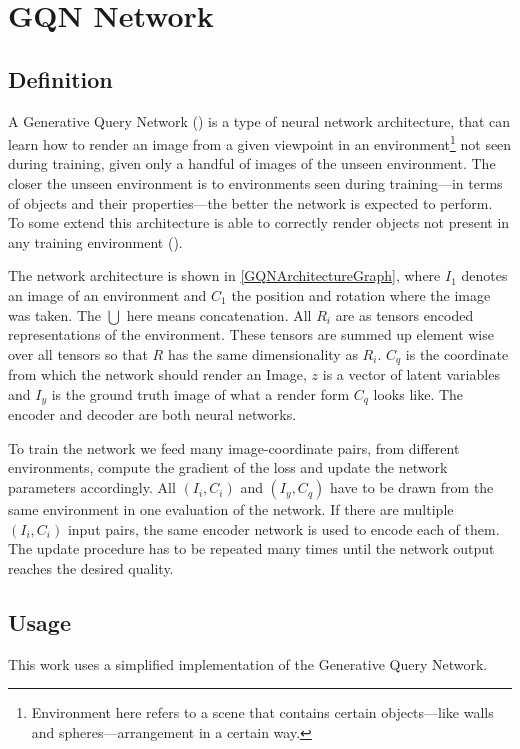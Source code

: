 \section{GQN Network}\label{BackgroundGQN}
\subsection{Definition}
A Generative Query Network (\cite{gqn}) is a type of neural network architecture, that can learn how to render an image from a given viewpoint in an environment\footnote{Environment here refers to a scene that contains certain objects---like walls and spheres---arrangement in a certain way.} not seen during training, given only a handful of images of the unseen environment. The closer the unseen environment is to environments seen during training---in terms of objects and their properties---the better the network is expected to perform. To some extend this architecture is able to correctly render objects not present in any training environment (\cite{gqn}).

The network architecture is shown in \cref{GQNArchitectureGraph}, where $I_1$ denotes an image of an environment and $C_1$ the position and rotation where the image was taken. The $\bigcup$ here means concatenation. All $R_i$ are as tensors encoded representations of the environment. These tensors are summed up element wise over all tensors so that $R$ has the same dimensionality as $R_i$. $C_q$ is the coordinate from which the network should render an Image, $z$ is a vector of latent variables and $I_y$ is the ground truth image of what a render form $C_q$ looks like. The encoder and decoder are both neural networks.

To train the network we feed many image-coordinate pairs, from different environments, compute the gradient of the loss and update the network parameters accordingly. All $(I_i, C_i)$ and $(I_y, C_q)$ have to be drawn from the same environment in one evaluation of the network. If there are multiple $(I_i, C_i)$ input pairs, the same encoder network is used to encode each of them. The update procedure has to be repeated many times until the network output reaches the desired quality.

\GQNArchitectureGraph


\subsection{Usage}
This work uses a simplified implementation of the Generative Query Network.

